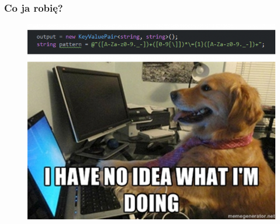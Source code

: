 \documentclass[10pt,t]{beamer}
\begin{document}
\begin{frame}
  \frametitle{Co ja robię?}

  \vspace{-0.5em}


  \begin{figure}

    \label{fig:How-to-regex}

    \centering


    \includegraphics[scale=0.52]
    {./Presentations-pictures/Miscancellous-pictures/Lost-in-regex.png}

  \end{figure}

\end{frame}
\end{document}
